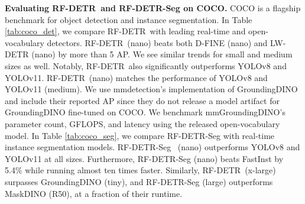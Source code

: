 \documentclass{article} %
\newcommand{\method}{RF-DETR}
\begin{document}
\textbf{Evaluating \method \ and \method-Seg on COCO.} COCO \citep{lin2014coco} is a flagship benchmark for object detection and instance segmentation. In Table \ref{tab:coco_det}, we compare \method \ with leading real-time and open-vocabulary detectors. \method \ (nano) beats both D-FINE (nano) and LW-DETR (nano) by more than 5 AP. We see similar trends for small and medium sizes as well. Notably, \method \ also significantly outperforms YOLOv8 and YOLOv11. \method \ (nano) matches the performance of YOLOv8 and YOLOv11 (medium). We use mmdetection's implementation of GroundingDINO and include their reported AP since they do not release a model artifact for GroundingDINO fine-tuned on COCO. We benchmark mmGroundingDINO's parameter count, GFLOPS, and latency using the released open-vocabulary model. In Table \ref{tab:coco_seg}, we compare \method-Seg with real-time instance segmentation models. \method-Seg \ (nano) outperforms YOLOv8 and YOLOv11 at all sizes. Furthermore, \method-Seg (nano) beats FastInst by 5.4\% while running almost ten times faster. Similarly, \method \ (x-large) surpasses GroundingDINO (tiny), and \method-Seg (large) outperforms MaskDINO (R50), at a fraction of their runtime. %
\end{document}
